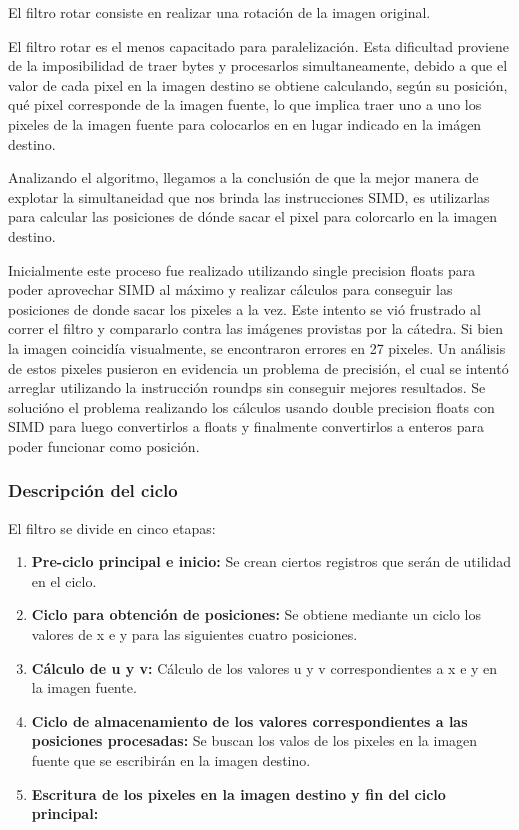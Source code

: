 El filtro rotar consiste en realizar una rotación de la imagen original.

El filtro rotar es el menos capacitado para paralelización. Esta dificultad proviene de la imposibilidad de traer bytes y procesarlos simultaneamente, debido a que el valor de cada pixel en la imagen destino se obtiene calculando, según su posición, qué pixel corresponde de la imagen fuente, lo que implica traer uno a uno los pixeles de la imagen fuente para colocarlos en en lugar indicado en la imágen destino.

Analizando el algoritmo, llegamos a la conclusión de que la mejor manera de explotar la simultaneidad que nos brinda las instrucciones SIMD, es utilizarlas para calcular las posiciones de dónde sacar el pixel para colorcarlo en la imagen destino. 

Inicialmente este proceso fue realizado utilizando single precision floats para poder aprovechar SIMD al máximo y realizar cálculos para conseguir las posiciones de donde sacar los pixeles a la vez. Este intento se vió frustrado al correr el filtro y compararlo contra las imágenes provistas por la cátedra. Si bien la imagen coincidía visualmente, se encontraron errores en 27 pixeles. Un análisis de estos pixeles pusieron en evidencia un problema de precisión, el cual se intentó arreglar utilizando la instrucción roundps sin conseguir mejores resultados. Se solucióno el problema realizando los cálculos usando double precision floats con SIMD para luego convertirlos a floats y finalmente convertirlos a enteros para poder funcionar como posición.

\subsubsection{Descripción del ciclo}
El filtro se divide en cinco etapas:
\begin{enumerate}
\item \textbf{Pre-ciclo principal e inicio:} Se crean ciertos registros que serán de utilidad en el ciclo.
\item \textbf{Ciclo para obtención de posiciones:} Se obtiene mediante un ciclo los valores de x e y para las siguientes cuatro posiciones.
\item \textbf{Cálculo de u y v:} Cálculo de los valores u y v correspondientes a x e y en la imagen fuente.
\item \textbf{Ciclo de almacenamiento de los valores correspondientes a las posiciones procesadas:} Se buscan los valos de los pixeles en la imagen fuente que se escribirán en la imagen destino.
\item \textbf{Escritura de los pixeles en la imagen destino y fin del ciclo principal:}
\end{enumerate}

